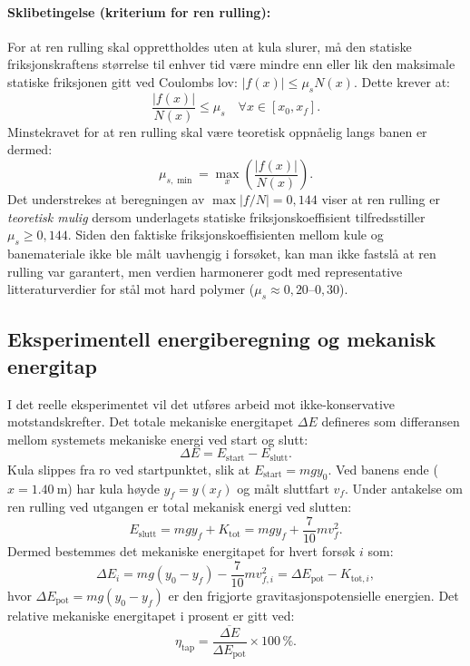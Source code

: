 \documentclass[11pt,a4paper]{article}
\begin{document}
\paragraph{Sklibetingelse (kriterium for ren rulling):}
For at ren rulling skal opprettholdes uten at kula slurer, må den statiske friksjonskraftens størrelse til enhver tid være mindre enn eller lik den maksimale statiske friksjonen gitt ved Coulombs lov: $|f(x)| \le \mu_s N(x)$. Dette krever at:
\begin{equation}
    \frac{|f(x)|}{N(x)} \le \mu_s \quad \forall x \in [x_0, x_f].
    \label{eq:sklikrav}
\end{equation}
Minstekravet for at ren rulling skal være teoretisk oppnåelig langs banen er dermed:
\begin{equation}
    \mu_{s, \min} = \max_{x} \left( \frac{|f(x)|}{N(x)} \right).
    \label{eq:mu_min}
\end{equation}
Det understrekes at beregningen av $\max |f/N| = 0{,}144$ viser at ren rulling er \emph{teoretisk mulig} dersom underlagets statiske friksjonskoeffisient tilfredsstiller $\mu_s \ge 0{,}144$. Siden den faktiske friksjonskoeffisienten mellom kule og banemateriale ikke ble målt uavhengig i forsøket, kan man ikke fastslå at ren rulling var garantert, men verdien harmonerer godt med representative litteraturverdier for stål mot hard polymer ($\mu_s \approx 0{,}20$--$0{,}30$).

\subsection{Eksperimentell energiberegning og mekanisk energitap}
I det reelle eksperimentet vil det utføres arbeid mot ikke-konservative motstandskrefter. Det totale mekaniske energitapet $\Delta E$ defineres som differansen mellom systemets mekaniske energi ved start og slutt:
\begin{equation}
    \Delta E = E_{\text{start}} - E_{\text{slutt}}.
    \label{eq:energitap_def}
\end{equation}
Kula slippes fra ro ved startpunktet, slik at $E_{\text{start}} = mgy_0$. Ved banens ende ($x = \SI{1,40}{\meter}$) har kula høyde $y_f = y(x_f)$ og målt sluttfart $v_f$. Under antakelse om ren rulling ved utgangen er total mekanisk energi ved slutten:
\begin{equation}
    E_{\text{slutt}} = mgy_f + K_{\text{tot}} = mgy_f + \frac{7}{10}mv_f^2.
\end{equation}
Dermed bestemmes det mekaniske energitapet for hvert forsøk $i$ som:
\begin{equation}
    \Delta E_i = mg(y_0 - y_f) - \frac{7}{10}mv_{f, i}^2 = \Delta E_{\text{pot}} - K_{\text{tot}, i},
    \label{eq:delta_e_i}
\end{equation}
hvor $\Delta E_{\text{pot}} = mg(y_0 - y_f)$ er den frigjorte gravitasjonspotensielle energien. Det relative mekaniske energitapet i prosent er gitt ved:
\begin{equation}
    \eta_{\text{tap}} = \frac{\overline{\Delta E}}{\Delta E_{\text{pot}}} \times 100\,\%.
    \label{eq:rel_tap}
\end{equation}
\end{document}
